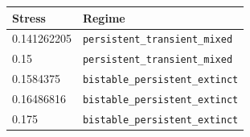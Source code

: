 \begin{tabular}{ll}
\toprule
Stress & Regime \\
\midrule
0.141262205 & \texttt{persistent\_transient\_mixed} \\
0.15 & \texttt{persistent\_transient\_mixed} \\
0.1584375 & \texttt{bistable\_persistent\_extinct} \\
0.16486816 & \texttt{bistable\_persistent\_extinct} \\
0.175 & \texttt{bistable\_persistent\_extinct} \\
\bottomrule
\end{tabular}
